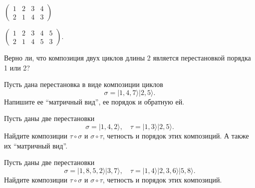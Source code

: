 \begin{tasks}
        \begin{enumerate*}[label=(\alph*), itemjoin=;\hspace{5ex}]
            \item \(\begin{pmatrix}
                    1 & 2 & 3 & 4 \\
                    2 & 1 & 4 & 3
                \end{pmatrix}\)
            \item \(\begin{pmatrix}
                    1 & 2 & 3 & 4 & 5 \\
                    2 & 1 & 4 & 5 & 3
                \end{pmatrix}\).
        \end{enumerate*} 
    \item Верно ли, что композиция двух циклов длины 2 является перестановкой порядка 1 или 2?
    \item Пусть дана перестановка в виде композиции циклов  \[
            \sigma = | 1, 4, 7 \rangle |2, 5 \rangle
        .\]  
        Напишите ее ``матричный вид'', ее порядок и обратную ей.
    \item Пусть даны две перестановки \[
            \sigma = | 1, 4, 2 \rangle 
            , \quad
            \tau = | 1, 3 \rangle | 2, 5 \rangle
        .\]
        Найдите композиции $\tau \circ \sigma$ и $\sigma \circ \tau$, четность и порядок этих композиций.
        А также их ``матричный вид''.
    \item Пусть даны две перестановки \[
            \sigma = | 1, 8, 5, 2 \rangle | 3, 7 \rangle
            , \quad
            \tau = | 1, 4\rangle |2,  3, 6 \rangle | 5, 8 \rangle
            .
        \]
        Найдите композиции $\tau \circ \sigma$ и $\sigma \circ \tau$, четность и порядок этих композиций.

\end{tasks}
